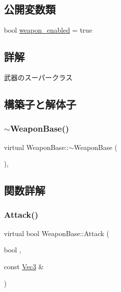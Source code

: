 \subsection*{公開変数類}
\begin{DoxyCompactItemize}
\item 
bool \mbox{\hyperlink{class_weapon_base_a54883e3ecbc54ff42ea381a17ef8cf8f}{weapon\+\_\+enabled}} = true
\end{DoxyCompactItemize}


\subsection{詳解}
武器のスーパークラス 

\subsection{構築子と解体子}
\mbox{\label{class_weapon_base_a311bee6c8496581f21068867be48762f}} 
\subsubsection{\texorpdfstring{$\sim$\+Weapon\+Base()}{~WeaponBase()}}
{\footnotesize\ttfamily virtual Weapon\+Base\+::$\sim$\+Weapon\+Base (\begin{DoxyParamCaption}{ }\end{DoxyParamCaption})\hspace{0.3cm}{\ttfamily [inline]}, {\ttfamily [virtual]}}



\subsection{関数詳解}
\mbox{\label{class_weapon_base_a1bab9c7fb9524db754bebbbcbf6c2fd9}} 
\subsubsection{\texorpdfstring{Attack()}{Attack()}}
{\footnotesize\ttfamily virtual bool Weapon\+Base\+::\+Attack (\begin{DoxyParamCaption}\item[{bool}]{,  }\item[{const \mbox{\hyperlink{common_8h_ab1cb35b3a17c398d8ef71d5f779808bf}{Vec3}} \&}]{ }\end{DoxyParamCaption})\hspace{0.3cm}{\ttfamily [pure virtual]}}



